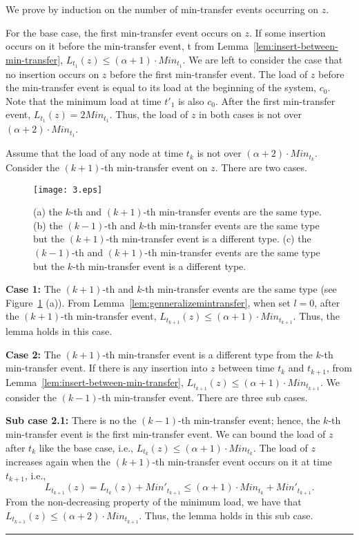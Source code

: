 \documentclass[a4paper]{article}
\newenvironment{proof}{{\bf Proof:}}{\hfill\rule{1.5mm}{3mm}\vspace{0.1in}}
\begin{document}
\begin{proof}
  We prove by induction on the number of min-transfer events occurring
  on $z$.
  
  For the base case, the first min-transfer event occurs on $z$.  If
  some insertion occurs on it before the min-transfer event, t
  from Lemma~\ref{lem:insert-between-min-transfer}, 
  $L_{t_1}(z)\leq(\alpha+1)\cdot Min_{t_1}$. We are left to consider the
  case that no insertion occurs on $z$ before the first min-transfer
  event.  The load of $z$ before the min-transfer event is equal to its
  load at the beginning of the system, $c_0$. Note that the minimum
  load at time $t'_1$ is also $c_0$. After the first
  min-transfer event, $L_{t_1}(z) = 2Min_{t_1}$. Thus, the load of $z$ 
   in both cases is not over $(\alpha+2)\cdot Min_{t_1}$.
    
  Assume that the load of any node at time $t_k$ is not over $(\alpha
  +2)\cdot Min_{t_k}$. Consider the $(k+1)$-th min-transfer event on
  $z$. There are two cases.

  \begin{figure}
    \centering \texttt{[image: 3.eps]}
    \caption{(a) the $k$-th and $(k+1)$-th min-transfer events are the same
      type. (b) the $(k-1)$-th and $k$-th min-transfer events are the same
      type but the $(k+1)$-th min-transfer event is a different type.
      (c) the $(k-1)$-th and $(k+1)$-th min-transfer events are the same
      type but the $k$-th min-transfer event is a different type.}
    \label{fig:3}
  \end{figure}

  \textbf{Case 1:} The $(k+1)$-th and $k$-th min-transfer events
  are the same type (see Figure~\ref{fig:3} (a)).  From
  Lemma~\ref{lem:genneralizemintransfer}, when set $l=0$, after the
  $(k+1)$-th min-transfer event, $L_{t_{k+1}}(z)\leq(\alpha+1)\cdot Min_{t_{k+1}}$. 
  Thus, the lemma holds in this case.

  \textbf{Case 2:} The $(k+1)$-th min-transfer event is a different type
  from the $k$-th min-transfer event. If there is any insertion into
  $z$ between time $t_{k}$ and $t_{k+1}$, from
  Lemma~\ref{lem:insert-between-min-transfer}, 
  $L_{t_{k+1}}(z)\leq(\alpha+1)\cdot Min_{t_{k+1}}$.  We consider the $(k-1)$-th
  min-transfer event.  There are three sub cases.

  \textbf{Sub case 2.1:} There is no the $(k-1)$-th min-transfer event;
  hence, the $k$-th min-transfer event is the first min-transfer event. 
  We can bound the load of $z$ after $t_k$ like the base case,
  i.e., $L_{t_{k}}(z) \leq (\alpha+1)\cdot Min_{t_{k}}$. The load of $z$
  increases again when the $(k+1)$-th min-transfer event occurs on
  it at time $t_{k+1}$, i.e.,
  \[ L_{t_{k+1}}(z)= L_{t_{k}}(z) +  Min'_{t_{k+1}} \leq (\alpha+1)\cdot Min_{t_{k}}+ Min'_{t_{k+1}}.\]
  From the non-decreasing property of the minimum load, we have that $
  L_{t_{k+1}}(z) \leq (\alpha+2)\cdot Min_{t_{k+1}}$. Thus, the lemma
  holds in this sub case.


\end{proof}
\end{document}
